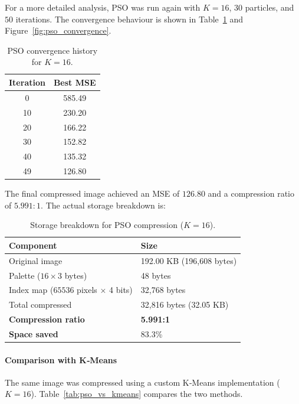 For a more detailed analysis, PSO was run again with $K=16$, $30$ particles, and $50$ iterations. The convergence behaviour is shown in Table~\ref{tab:pso_convergence} and Figure~\ref{fig:pso_convergence}.



\begin{table}[H]
\centering
\caption{PSO convergence history for $K=16$.}
\label{tab:pso_convergence}
\begin{tabular}{|c|c|}
\hline
\textbf{Iteration} & \textbf{Best MSE} \\
\hline
0   & 585.49 \\
10  & 230.20 \\
20  & 166.22 \\
30  & 152.82 \\
40  & 135.32 \\
49  & 126.80 \\
\hline
\end{tabular}
\end{table}

The final compressed image achieved an MSE of $126.80$ and a compression ratio of $5.991:1$. The actual storage breakdown is:

\begin{table}[H]
\centering
\caption{Storage breakdown for PSO compression ($K=16$).}
\label{tab:pso_storage}
\begin{tabularx}{\textwidth}{|l|X|}
\hline
\textbf{Component} & \textbf{Size} \\
\hline
Original image & 192.00 KB (196,608 bytes) \\
Palette ($16\times3$ bytes) & 48 bytes \\
Index map ($65536$ pixels $\times$ 4 bits) & 32,768 bytes \\
Total compressed & 32,816 bytes (32.05 KB) \\
\hline
\textbf{Compression ratio} & \textbf{5.991:1} \\
\textbf{Space saved} & 83.3\% \\
\hline
\end{tabularx}
\end{table}

\paragraph{Comparison with K‑Means}
The same image was compressed using a custom K‑Means implementation ($K=16$). Table~\ref{tab:pso_vs_kmeans} compares the two methods.

